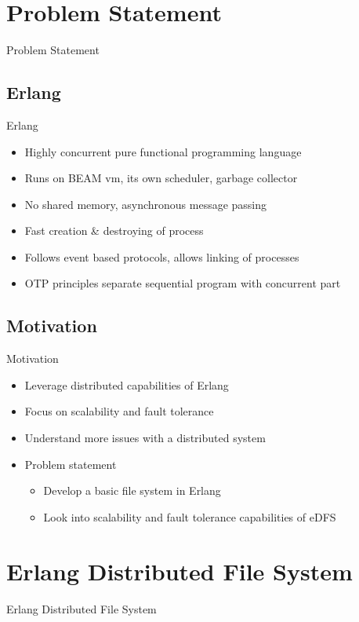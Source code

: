 \documentclass{beamer}
\begin{document}
\section{Problem Statement}
\begin{frame}{Problem Statement}
\addtocounter{framenumber}{-1}
\tableofcontents[currentsection]
\end{frame}

\subsection{Erlang}
\begin{frame}{Erlang}
\begin{itemize}
\item Highly concurrent pure functional programming language
\item Runs on BEAM vm, its own scheduler, garbage collector
\item No shared memory, asynchronous message passing
\item Fast creation \& destroying of process
\item Follows event based protocols, allows linking of processes
\item OTP principles separate sequential program with concurrent part
\end{itemize}
\end{frame}

\subsection{Motivation}
\begin{frame}{Motivation}
\begin{itemize}
\item Leverage distributed capabilities of Erlang
\item Focus on scalability and fault tolerance
\item Understand more issues with a distributed system
\item Problem statement
\begin{itemize}
\item Develop a basic file system in Erlang
\item Look into scalability and fault tolerance capabilities of eDFS
\end{itemize}
\end{itemize}
\end{frame}


\section{Erlang Distributed File System}
\begin{frame}{Erlang Distributed File System}
\addtocounter{framenumber}{-1}
\tableofcontents[currentsection]
\end{frame}
\end{document}
